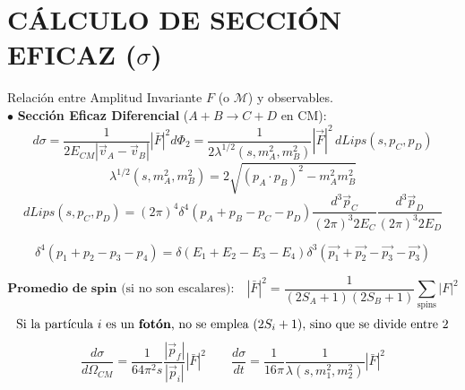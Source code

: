 \section{CÁLCULO DE SECCIÓN EFICAZ ($\sigma$)}
Relación entre Amplitud Invariante $F$ (o $\mathcal{M}$) y observables.\\
$\bullet$ \textbf{Sección Eficaz Diferencial} ($A+B \to C+D$ en CM):
$$ d\sigma = \frac{1}{2E_{CM} |\vec{v}_A - \vec{v}_B|} |\bar{F}|^2 d\Phi_2= \frac{1}{2\lambda^{1/2} (s, m_A^2, m_B^2)} |\vec{F}|^2 \, dLips(s, p_C, p_D) $$
$$\lambda^{1/2} (s, m_A^2, m_B^2) = 2 \sqrt{(p_A \cdot p_B)^2 - m_A^2 m_B^2}$$
$$ d{Lips}(s, p_C, p_D)  = (2\pi)^4 \delta^4(p_A+p_B- p_C -p_D) \frac{d^3\vec{p}_C}{(2\pi)^3 2E_C} \frac{d^3\vec{p}_D}{(2\pi)^3 2E_D}$$

$$\delta^4 (p_1 +p_2-p_3 -p_4) = \delta (E_1+E_2-E_3-E_4) \delta^3(\vec{p_1}+\vec{p_2}-\vec{p_3}-\vec{p_3})$$

$$ \textbf{Promedio de spin} \text{ (si no son escalares):}\quad|\bar{F}|^2 = \frac{1}{(2S_A+1)(2S_B+1)} \sum_{\text{spins}} |F|^2 $$
$$\text{Si la partícula $i$ es un \textbf{fotón}, no se emplea $(2S_i +1),$ sino que se divide entre 2}$$
$$ \frac{d\sigma}{d\Omega_{CM}} = \frac{1}{64\pi^2 s} \frac{|\vec{p}_f|}{|\vec{p}_i|} |\bar{F}|^2 \qquad \frac{d\sigma}{dt}= \frac{1}{16\pi} \frac{1}{\lambda(s, m_1^2, m_2^2)} |\bar{F}|^2 $$






